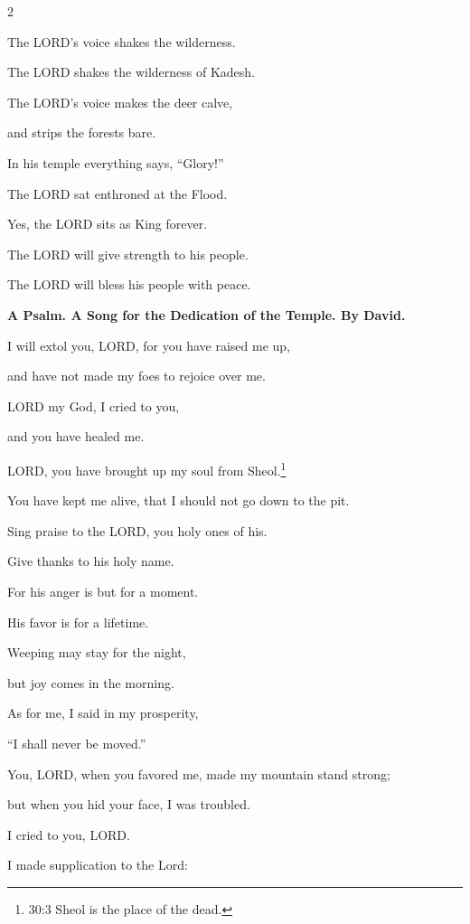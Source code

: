 \begin{multicols}{2}
	
	\myverse{}The LORD’s voice shakes the wilderness.
	
	The LORD shakes the wilderness of Kadesh.
	
	
	\myverse{}The LORD’s voice makes the deer calve,
	
	and strips the forests bare.
	
	In his temple everything says, “Glory!”
	
	\vspace{\baselineskip}
	
	\myverse{}The LORD sat enthroned at the Flood.
	
	Yes, the LORD sits as King forever.
	
	
	\myverse{}The LORD will give strength to his people.
	
	The LORD will bless his people with peace.
	
	
	\mychapter{}\textbf{A Psalm. A Song for the Dedication of the Temple. By David.}
	
	\myverse*{}I will extol you, LORD, for you have raised me up,
	
	and have not made my foes to rejoice over me.
	
	
	\myverse{}LORD my God, I cried to you,
	
	and you have healed me.
	
	
	\myverse{}LORD, you have brought up my soul from Sheol.\footnote{30:3 Sheol is the place of the dead.}
	
	You have kept me alive, that I should not go down to the pit.
	
	
	\myverse{}Sing praise to the LORD, you holy ones of his.
	
	Give thanks to his holy name.
	
	
	\myverse{}For his anger is but for a moment.
	
	His favor is for a lifetime.
	
	Weeping may stay for the night,
	
	but joy comes in the morning.
	
	
	\myverse{}As for me, I said in my prosperity,
	
	“I shall never be moved.”
	
	
	\myverse{}You, LORD, when you favored me, made my mountain stand strong;
	
	but when you hid your face, I was troubled.
	
	
	\myverse{}I cried to you, LORD.
	
	I made supplication to the Lord:
	

\end{multicols}
